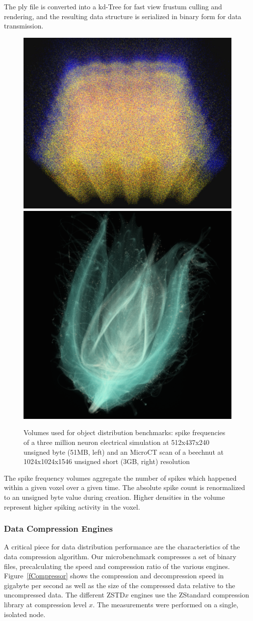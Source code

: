 \documentclass[10pt,journal,compsoc]{IEEEtran}
\newcommand{\fig}[1]{Figure~\ref{#1}}
\begin{document}
The ply file is converted into a kd-Tree for fast view frustum culling and
rendering, and the resulting data structure is serialized in binary form for
data transmission.

\begin{figure}[ht]\center
  \includegraphics[height=.44\columnwidth]{images/spikes512}\hfil
  \includegraphics[height=.44\columnwidth]{images/beechnut}
  \caption{\label{fVolumes}Volumes used for object distribution benchmarks:
    spike frequencies of a three million neuron electrical simulation at
    512x437x240 unsigned byte (51MB, left) and an MicroCT scan of a beechnut at
    1024x1024x1546 unsigned short (3GB, right) resolution}
\end{figure}

The spike frequency volumes aggregate the number of spikes which happened within
a given voxel over a given time. The absolute spike count is renormalized to an
unsigned byte value during creation. Higher densities in the volume represent
higher spiking activity in the voxel.

\subsubsection{Data Compression Engines}

A critical piece for data distribution performance are the characteristics of
the data compression algorithm. Our microbenchmark compresses a set of binary
files, precalculating the speed and compression ratio of the various engines.
\fig{fCompressor} shows the compression and decompression speed in gigabyte per
second as well as the size of the compressed data relative to the uncompressed
data. The different ZSTD$x$ engines use the ZStandard compression library at
compression level $x$. The measurements were performed on a single, isolated
node.
\end{document}
